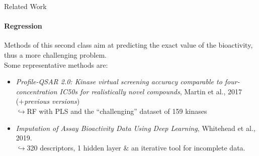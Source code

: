 \documentclass[11pt]{beamer}
\begin{document}
\begin{frame}{Related Work}
    \framesubtitle{Regression}
    Methods of this second class aim at predicting the exact value of the bioactivity, thus a more challenging problem.\\
       \vspace{5mm}
    Some representative methods are:
    \begin{itemize}
    	\item \textit{Profile-QSAR 2.0: Kinase virtual screening accuracy comparable to four-concentration IC50s for realistically novel compounds}, Martin et al., 2017 (+\textit{previous versions})\\
    	$\hookrightarrow${\footnotesize  RF with PLS and the ``challenging'' dataset of 159 kinases}
    	\item \textit{Imputation of Assay Bioactivity Data Using Deep Learning}, Whitehead et al., 2019.\\
    	$\hookrightarrow${\footnotesize  320 descriptors, 1 hidden layer $\&$ an iterative tool for incomplete data. }
    \end{itemize}
\end{frame}
\end{document}
